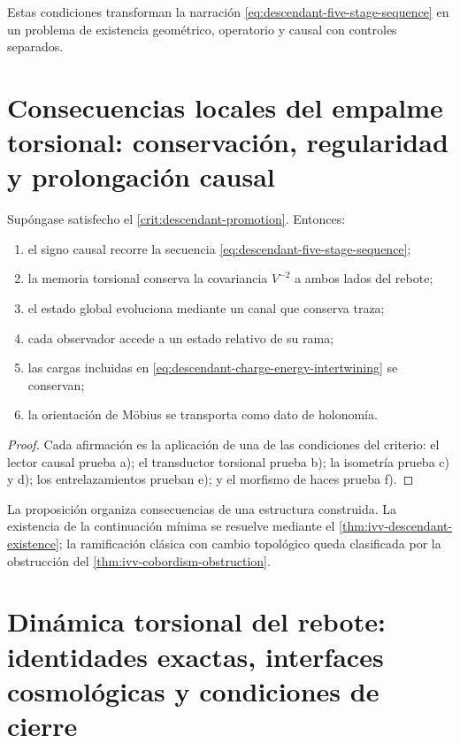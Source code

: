 Estas condiciones transforman la narraci\'on
\cref{eq:descendant-five-stage-sequence} en un problema de existencia
geom\'etrico, operatorio y causal con controles separados.

\section{Consecuencias locales del empalme torsional: conservación, regularidad y prolongación causal}

\begin{proposition}
\label{prop:descendant-conditioned-consequences}
Sup\'ongase satisfecho el
\cref{crit:descendant-promotion}. Entonces:
\begin{enumerate}[label=\alph*)]
 \item el signo causal recorre la secuencia
       \cref{eq:descendant-five-stage-sequence};
 \item la memoria torsional conserva la covariancia \(V^{-2}\) a ambos
       lados del rebote;
 \item el estado global evoluciona mediante un canal que conserva traza;
 \item cada observador accede a un estado relativo de su rama;
 \item las cargas incluidas en
       \cref{eq:descendant-charge-energy-intertwining} se conservan;
 \item la orientaci\'on de M\"obius se transporta como dato de holonom\'ia.
\end{enumerate}
\end{proposition}

\begin{proof}
Cada afirmaci\'on es la aplicaci\'on de una de las condiciones del criterio:
el lector causal prueba a); el transductor torsional prueba b); la isometr\'ia
prueba c) y d); los entrelazamientos prueban e); y el morfismo de haces prueba
f).
\end{proof}

La proposici\'on organiza consecuencias de una estructura construida. La
existencia de la continuaci\'on m\'inima se resuelve mediante el
\cref{thm:ivv-descendant-existence}; la ramificaci\'on cl\'asica con cambio
topol\'ogico queda clasificada por la obstrucci\'on del
\cref{thm:ivv-cobordism-obstruction}.

\section{Dinámica torsional del rebote: identidades exactas, interfaces cosmológicas y condiciones de cierre}

